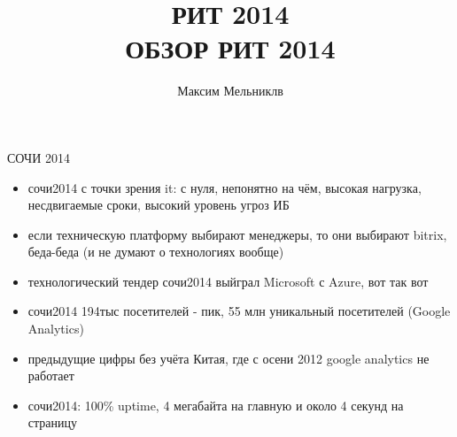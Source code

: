 \documentclass[aspectratio=169]{beamer}
\begin{document}
\title{РИТ 2014}
\author{Максим Мельниклв}
\date{}

{
\title{
    \\
    {\huge ОБЗОР РИТ 2014}
    \\
}

\begin{frame}[plain]{}
    \titlepage
\end{frame}
}


\begin{frame}{СОЧИ 2014}
\begin{itemize}
  \item сочи2014 с точки зрения it: с нуля, непонятно на чём, высокая нагрузка, несдвигаемые сроки, высокий уровень угроз ИБ
  \item если техническую платформу выбирают менеджеры, то они выбирают bitrix, беда-беда (и не думают о технологиях вообще)
  \item технологический тендер сочи2014 выйграл Microsoft с Azure, вот так вот
  \item сочи2014 194тыс посетителей - пик, 55 млн уникальный посетителей (Google Analytics)
  \item предыдущие цифры без учёта Китая, где с осени 2012 google analytics не работает
  \item сочи2014: 100\% uptime, 4 мегабайта на главную и около 4 секунд на страницу
\end{itemize}
\end{frame}
  
\end{document}
